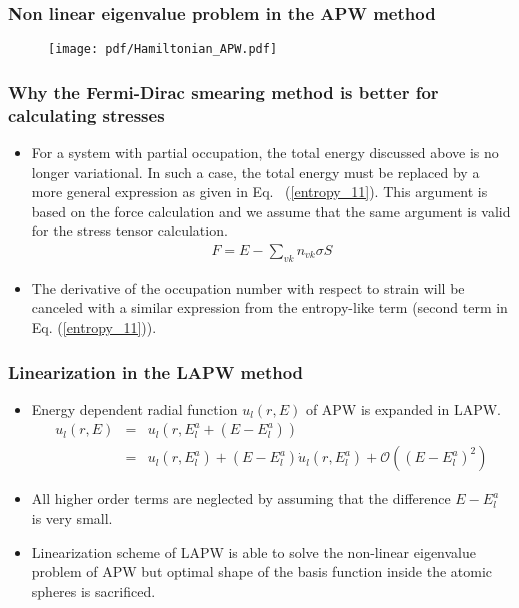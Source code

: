 \documentclass[10pt, handout]{beamer}
\begin{document}
\begin{frame}
	\frametitle{Non linear eigenvalue problem in the APW method}
	\begin{figure}
		\texttt{[image: pdf/Hamiltonian\_APW.pdf]} 
	\end{figure}


{\tiny }
\end{frame}
	
\begin{frame}
	\frametitle{Why the Fermi-Dirac smearing method is better for calculating stresses}
\small{	
	\begin{itemize}
		\item For a system with partial occupation, the total energy discussed above is no longer variational. In such a case, the total energy must be replaced by a more general expression as given in Eq.~ (\ref{entropy_11}). This argument is based on the force calculation and we assume that the same argument is valid for the stress tensor calculation.
		\begin{eqnarray}\label{entropy_11}
			F = E - \sum_{vk}n_{vk}\sigma S
		\end{eqnarray}
	    \item The derivative of the occupation number with respect to strain will be canceled with a similar expression from the entropy-like term (second term in Eq. (\ref{entropy_11})).
	\end{itemize}
}
\end{frame}


\small{
	\begin{frame}
		\frametitle{Linearization in the LAPW method}
		\begin{itemize}
				\item Energy dependent radial function $u_l(r,E)$ of APW is expanded in LAPW.
				\begin{eqnarray}\nonumber
					u_l(r,E) &=& u_l(r,E_l^a + (E-E_l^a)) \\ \nonumber
					         &=& u_l(r,E_l^a) + (E-E_l^a)\dot{u}_l(r,E_l^a) + \mathcal{O}((E-E_l^a)^2)
				\end{eqnarray}
			    \item All higher order terms are neglected by assuming that the difference $E-E_l^a$ is very small.
			    \item Linearization scheme of LAPW is able to solve the non-linear eigenvalue problem of APW but optimal shape of the basis function inside the atomic spheres is sacrificed. 
			\end{itemize}
	\end{frame}	
	}
\end{document}

